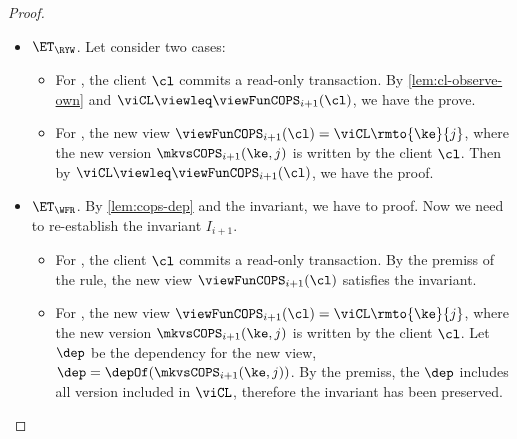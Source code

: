 \begin{proof}
\begin{itemize}
        \item \( \ET_\RYW \). Let consider two cases:
            \begin{itemize}
                \item 
                For , the client \( \cl \) commits a read-only transaction.
                By \cref{lem:cl-observe-own} and  \( \viCL \viewleq \viewFunCOPS_{i+1}(\cl) \),
                we have the prove.
            \item For , the new view \( \viewFunCOPS_{i+1}(\cl) = \viCL\rmto{\ke}{j} \),
                where the new version \( \mkvsCOPS_{i+1}(\ke,j)\) is written by the client \( \cl \).
                Then by \( \viCL \viewleq \viewFunCOPS_{i+1}(\cl) \), we have the proof.
            \end{itemize}

        \item \( \ET_\WFR \).
            By \cref{lem:cops-dep} and the invariant, we have to proof.
            Now we need to re-establish the invariant \( I_{i+1} \).
            \begin{itemize}
                \item 
                For , the client \( \cl \) commits a read-only transaction.
                By the premiss of the rule, the new view \( \viewFunCOPS_{i+1}(\cl) \) satisfies the invariant.
                \item For , the new view \( \viewFunCOPS_{i+1}(\cl) = \viCL\rmto{\ke}{j} \),
                where the new version \( \mkvsCOPS_{i+1}(\ke,j)\) is written by the client \( \cl \).
                Let \( \dep \) be the dependency for the new view, \ie \( \dep = \depOf(\mkvsCOPS_{i+1}(\ke,j)) \).
                By the premiss, the \( \dep \) includes all version included in \( \viCL \), 
                therefore the invariant has been preserved.
            \end{itemize}
    \end{itemize}
\end{proof}

